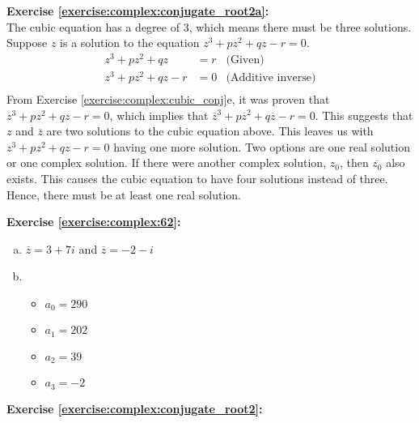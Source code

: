 \noindent\textbf{Exercise \ref{exercise:complex:conjugate_root2a}:}\\ %
The cubic equation has a degree of $3$, which means there must be three solutions. Suppose $z$ is a solution to the equation $z^{3} + pz^{2} + qz - r = 0$.  
\begin{align*}
z^{3} + pz^{2} + qz &= r &\text{(Given)}\\
z^{3} + pz^{2} + qz - r&= 0 &\text{(Additive inverse)}\\
\end{align*}
From Exercise \ref{exercise:complex:cubic_conj}e, it was proven that $z^3 + pz^2 + qz - r = 0$, which implies that $\overline{z}^{3}+ p\overline{z}^{2} + q\overline{z} - r = 0$. This suggests that $z$ and $\overline{z}$ are two solutions to the cubic equation above. This leaves us with $z^3 + pz^2 + qz - r = 0$ having one more solution. Two options are one real solution or one complex solution. If there were another complex solution, $z_{0}$, then $\overline{z_{0}}$ also exists. This causes the cubic equation to have four solutions instead of three. Hence, there must be at least one real solution.
  
\noindent\textbf{Exercise \ref{exercise:complex:62}:} %
\begin{enumerate}[(a)]
\item
$\overline{z} = 3 + 7i$ and $\overline{z} = -2 - i$

\item
	\begin{itemize}
	\item
	$a_{0} = 290$
	
	\item
	$a_{1} = 202$
	
	\item
	$a_{2} = 39$
	
	\item
	$a_{3} = -2$
	\end{itemize}
\end{enumerate}

\noindent\textbf{Exercise \ref{exercise:complex:conjugate_root2}:}

